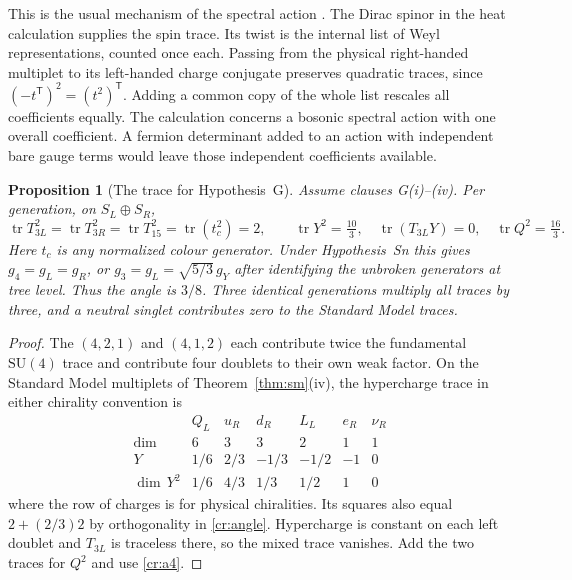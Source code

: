 \documentclass[aps,pra,onecolumn,superscriptaddress,nofootinbib,10pt]{revtex4-2}
\newtheorem{proposition}[theorem]{Proposition}
\theoremstyle{definition}
\theoremstyle{remark}
\newcommand{\SU}{\mathrm{SU}}
\begin{document}
This is the usual mechanism of the spectral action
\cite{n7:CC,cr:ccm}. The Dirac spinor in the heat calculation supplies
the spin trace. Its twist is the internal list of Weyl representations,
counted once each. Passing from the physical right-handed multiplet
to its left-handed charge conjugate preserves quadratic traces, since
$( -t^{\mathsf T})^2=(t^2)^{\mathsf T}$. Adding a common copy of the
whole list rescales all coefficients equally. The calculation concerns
a bosonic spectral action with one overall coefficient. A fermion
determinant added to an action with independent bare gauge terms
would leave those independent coefficients available.

\begin{proposition}[The trace for Hypothesis~G]\label{cr:gtrace}
Assume clauses G(i)--(iv). Per generation, on $S_L\oplus S_R$,
\[
 \operatorname{tr}T_{3L}^2=\operatorname{tr}T_{3R}^2
 =\operatorname{tr}T_{15}^2=\operatorname{tr}(t_c^2)=2,
 \qquad
 \operatorname{tr}Y^2=\tfrac{10}{3},\quad
 \operatorname{tr}(T_{3L}Y)=0,\quad
 \operatorname{tr}Q^2=\tfrac{16}{3}.
\]
Here $t_c$ is any normalized colour generator. Under
Hypothesis~Sn this gives
$g_4=g_L=g_R$, or $g_3=g_L=\sqrt{5/3}\,g_Y$ after identifying the
unbroken generators at tree level. Thus the angle is $3/8$.
Three identical generations multiply all traces by three, and a
neutral singlet contributes zero to the Standard Model traces.
\end{proposition}
\begin{proof}
The $(4,2,1)$ and $(4,1,2)$ each contribute twice the
fundamental $\SU(4)$ trace and contribute four doublets
to their own weak factor. On the Standard Model multiplets of
Theorem~\ref{thm:sm}(iv), the hypercharge trace in either chirality
convention is
\[
 \begin{array}{c|rrrrrr}
 & Q_L & u_R & d_R & L_L & e_R & \nu_R\\ \hline
 \dim &6&3&3&2&1&1\\
 Y &1/6&2/3&-1/3&-1/2&-1&0\\
 \dim\,Y^2 &1/6&4/3&1/3&1/2&1&0
 \end{array}
\]
where the row of charges is for physical chiralities. Its squares
also equal $2+(2/3)2$ by orthogonality in \eqref{cr:angle}.
Hypercharge is constant on each left doublet and $T_{3L}$ is
traceless there, so the mixed trace vanishes. Add the two traces
for $Q^2$ and use \eqref{cr:a4}.
\end{proof}
\end{document}
